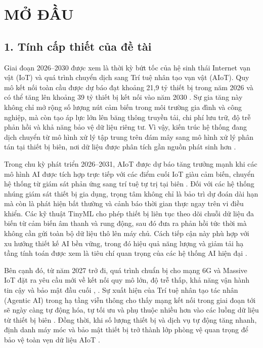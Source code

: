 \chapter*{MỞ ĐẦU}
\fontsize{13}{15}\selectfont

\section*{1. Tính cấp thiết của đề tài}
Giai đoạn 2026--2030 được xem là thời kỳ bứt tốc của hệ sinh thái Internet vạn vật (IoT) và quá trình chuyển dịch sang Trí tuệ nhân tạo vạn vật (AIoT). Quy mô kết nối toàn cầu được dự báo đạt khoảng 21,9 tỷ thiết bị trong năm 2026  và có thể tăng lên khoảng 39 tỷ thiết bị kết nối vào năm 2030 . Sự gia tăng này không chỉ mở rộng số lượng nút cảm biến trong môi trường gia đình và công nghiệp, mà còn tạo áp lực lớn lên băng thông truyền tải, chi phí lưu trữ, độ trễ phản hồi và khả năng bảo vệ dữ liệu riêng tư. Vì vậy, kiến trúc hệ thống đang dịch chuyển từ mô hình xử lý tập trung trên đám mây sang mô hình xử lý phân tán tại thiết bị biên, nơi dữ liệu được phân tích gần nguồn phát sinh hơn \cite{ref_1_4}.

Trong chu kỳ phát triển 2026--2031, AIoT được dự báo tăng trưởng mạnh khi các mô hình AI được tích hợp trực tiếp với các điểm cuối IoT giàu cảm biến, chuyển hệ thống từ giám sát phản ứng sang trí tuệ tự trị tại biên . Đối với các hệ thống nhúng giám sát thiết bị gia dụng, trọng tâm không chỉ là bảo trì dự đoán dài hạn mà còn là phát hiện bất thường và cảnh báo thời gian thực ngay trên vi điều khiển. Các kỹ thuật TinyML cho phép thiết bị liên tục theo dõi chuỗi dữ liệu đa biến từ cảm biến âm thanh và rung động, sau đó đưa ra phản hồi tức thời mà không cần gửi toàn bộ dữ liệu thô lên máy chủ. Cách tiếp cận này phù hợp với xu hướng thiết kế AI bền vững, trong đó hiệu quả năng lượng và giảm tải hạ tầng tính toán được xem là tiêu chí quan trọng của các hệ thống AI hiện đại .

Bên cạnh đó, từ năm 2027 trở đi, quá trình chuẩn bị cho mạng 6G và Massive IoT đặt ra yêu cầu mới về kết nối quy mô lớn, độ trễ thấp, khả năng vận hành tin cậy và bảo mật đầu cuối , . Sự xuất hiện của Trí tuệ nhân tạo tác nhân (Agentic AI) trong hạ tầng viễn thông cho thấy mạng kết nối trong giai đoạn tới sẽ ngày càng tự động hóa, tự tối ưu và phụ thuộc nhiều hơn vào các luồng dữ liệu từ thiết bị biên . Đồng thời, khi số lượng thiết bị và dịch vụ tự động tăng nhanh, định danh máy móc và bảo mật thiết bị trở thành lớp phòng vệ quan trọng để bảo vệ toàn vẹn dữ liệu AIoT .

